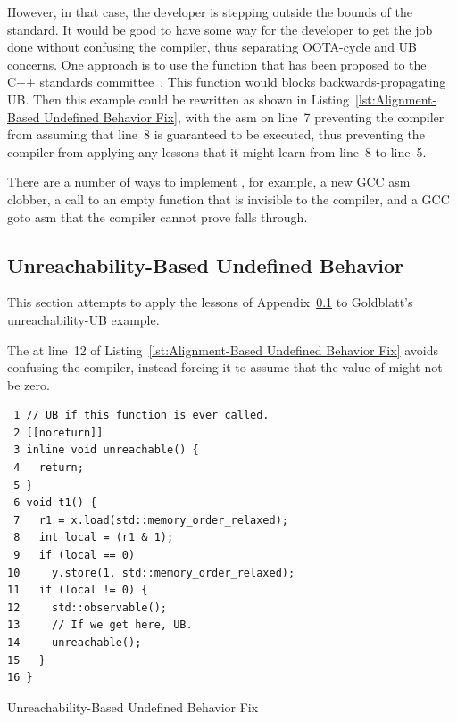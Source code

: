 \documentclass[10]{article}
\begin{document}
However, in that case, the developer is stepping outside the bounds
of the standard.
It would be good to have some way for the developer to get the job
done without confusing the compiler, thus separating OOTA-cycle and
UB concerns.
One approach is to use the  function
that has been proposed to the C++ standards
committee~\cite{DavisHerring2021P1494R2}.
This function would blocks backwards-propagating UB.
Then this example could be rewritten as shown in
Listing~\ref{lst:Alignment-Based Undefined Behavior Fix},
with the asm on line~7 preventing the compiler from assuming that line~8
is guaranteed to be executed, thus preventing the compiler from
applying any lessons that it might learn from line~8 to line~5.


There are a number of ways to implement ,
for example, a new  GCC asm clobber, a call to an empty
function that is invisible to the compiler, and a GCC goto asm that the
compiler cannot prove falls through.

\subsection{Unreachability-Based Undefined Behavior}
\label{sec:Unreachability-Based Undefined Behavior}

This section attempts to apply the lessons
of Appendix~\ref{sec:Unreachability-Based Undefined Behavior} to
Goldblatt's unreachability-UB example.

The  at line~12 of
Listing~\ref{lst:Alignment-Based Undefined Behavior Fix}
avoids confusing the compiler, instead forcing it to assume that the
value of  might not be zero.

\begin{listing}[tbp]
\begin{verbatim}
 1 // UB if this function is ever called.
 2 [[noreturn]]
 3 inline void unreachable() {
 4   return;
 5 }
 6 void t1() {
 7   r1 = x.load(std::memory_order_relaxed);
 8   int local = (r1 & 1);
 9   if (local == 0)
10     y.store(1, std::memory_order_relaxed);
11   if (local != 0) {
12     std::observable();
13     // If we get here, UB.
14     unreachable();
15   }
16 }
\end{verbatim}
\caption{Unreachability-Based Undefined Behavior Fix}
\label{lst:Unreachability-Based Undefined Behavior Fix}
\end{listing}
\end{document}
